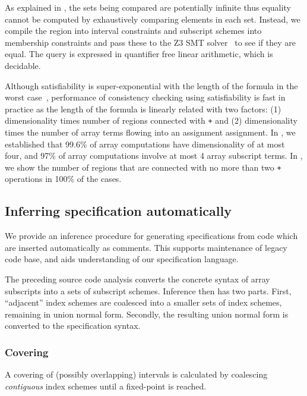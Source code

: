 As explained in , the sets being compared are
potentially infinite thus equality cannot be computed by exhaustively
comparing elements in each set. Instead, we compile the region into
interval constraints and subscript schemes into membership constraints and pass
these to the \textsc{Z3} SMT solver~\citep{de2008z3} to see if they are equal. The
query is expressed in quantifier free linear arithmetic, which is decidable.

Although satisfiability is super-exponential with the length of the formula in
the worst case~\cite{fischer1974super}, performance of consistency checking
using satisfiability is fast in practice as the length of the formula is linearly
related with two factors: (1) dimensionality times number of regions connected
with \texttt{+} and (2) dimensionality times the number of array terms flowing
into an assignment assignment. In , we
established that  99.6\% of array computations have 
dimensionality of at most four, and 97\% of array computations
involve at most 4 array subscript terms. In
, we show the number of regions that are
connected with no more than two \texttt{+} operations in 100\% of the cases.


\subsection{Inferring specification automatically}
\label{subsec:inference}
%
\noindent
We provide an inference procedure for generating specifications from
code which are inserted automatically as comments. This supports
maintenance of legacy code base, and aids understanding of our
specification language. 

The preceding source code analysis converts the concrete syntax of
array subscripts into a sets of subscript schemes. Inference then has
two parts. First, ``adjacent'' index schemes are coalesced into a
smaller sets of index schemes, remaining in union normal
form. Secondly, the resulting union normal form is converted to the
specification syntax.

\subsubsection{Covering}
A covering of (possibly overlapping) intervals is calculated
by coalescing \emph{contiguous} index schemes
until a fixed-point is reached.

